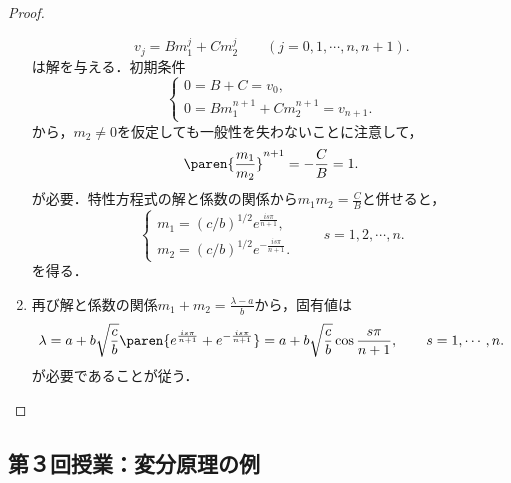 \documentclass[uplatex,dvipdfmx]{jsarticle}
\begin{document}
\begin{proof}
\begin{enumerate}[{Step}1]
        \[v_j=Bm_1^j+Cm_2^j\qquad(j=0,1,\cdots,n,n+1).\]
        は解を与える．初期条件
        \[\begin{cases}
            0=B+C=v_0,\\
            0=Bm_1^{n+1}+Cm_2^{n+1}=v_{n+1}.
        \end{cases}\]
        から，$m_2\ne0$を仮定しても一般性を失わないことに注意して，
        \[\paren{\frac{m_1}{m_2}}^{n+1}=-\frac{C}{B}=1.\]
        が必要．特性方程式の解と係数の関係から$m_1m_2=\frac{C}{B}$と併せると，
        \[\begin{cases}
            m_1=(c/b)^{1/2}e^{\frac{is\pi}{n+1}},\\
            m_2=(c/b)^{1/2}e^{-\frac{is\pi}{n+1}}.
        \end{cases}\qquad s=1,2,\cdots,n.\]
        を得る．
        \item 再び解と係数の関係$m_1+m_2=\frac{\lambda-a}{b}$から，固有値は
        \[\lambda=a+b\sqrt{\frac{c}{b}}\paren{e^{\frac{is\pi}{n+1}}+e^{-\frac{is\pi}{n+1}}}=a+b\sqrt{\frac{c}{b}}\cos\frac{s\pi}{n+1},\qquad s=1,\cdots,n.\]
        が必要であることが従う．
    \end{enumerate}
\end{proof}

\subsection{第３回授業：変分原理の例}
\end{document}
